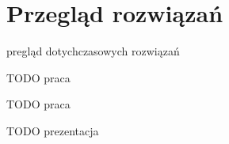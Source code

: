 \chapter{Przegląd rozwiązań}
pregląd dotychczasowych rozwiązań

TODO praca \cite{zakrzewski}

TODO praca \cite{jamroz+oskarbski}

TODO prezentacja \cite{pluta-zaremba+cichosz+nowicka}